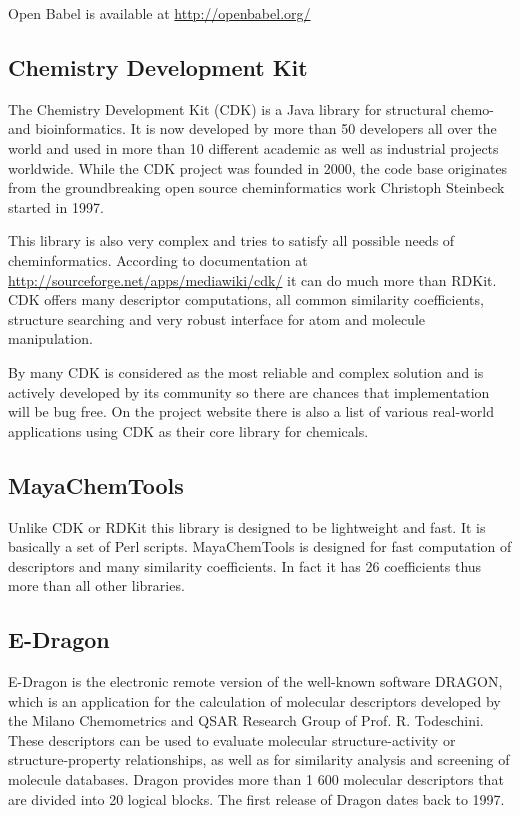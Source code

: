 \documentclass[thesis=M,english]{FITthesis}[2012/10/20]
\begin{document}
Open Babel is available at \url{http://openbabel.org/}


\subsection{Chemistry Development Kit}
The Chemistry Development Kit (CDK) is a Java library for structural chemo- and bioinformatics. It is now developed by more than 50 developers all over the world and used in more than 10 different academic as well as industrial projects worldwide\cite{cdk2}. While the CDK project was founded in 2000, the code base originates from the groundbreaking open source cheminformatics work Christoph Steinbeck started in 1997.\cite{cdk}

This library is also very complex and tries to satisfy all possible needs of cheminformatics. According to documentation at \url{http://sourceforge.net/apps/mediawiki/cdk/} it can do much more than RDKit. CDK offers many descriptor computations, all common similarity coefficients, structure searching and very robust interface for atom and molecule manipulation. 

By many CDK is considered as the most reliable and complex solution and is actively developed by its community so there are chances that implementation will be bug free. On the project website there is also a list of various real-world applications using CDK as their core library for chemicals.


\subsection{MayaChemTools}
Unlike CDK or RDKit this library is designed to be lightweight and fast. It is basically a set of Perl scripts. MayaChemTools is designed for fast computation of descriptors and many similarity coefficients. In fact it has 26 coefficients thus more than all other libraries.


\subsection{E-Dragon}
E-Dragon is the electronic remote version of the well-known software DRAGON, which is an application for the calculation of molecular descriptors developed by the Milano Chemometrics and QSAR Research Group of Prof. R. Todeschini. These descriptors can be used to evaluate molecular structure-activity or structure-property relationships, as well as for similarity analysis and screening of molecule databases. Dragon provides more than 1 600 molecular descriptors that are divided into 20 logical blocks. The first release of Dragon dates back to 1997.\cite{dragon} 
\end{document}
